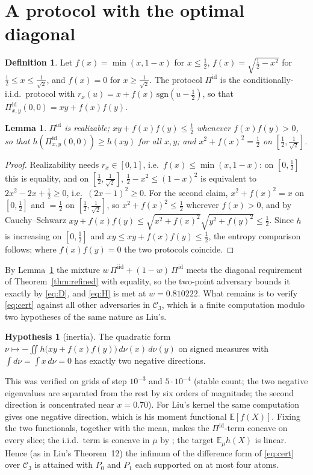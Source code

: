 \documentclass[11pt]{article}
\newtheorem{lemma}[theorem]{Lemma}
\theoremstyle{definition}
\newtheorem{definition}[theorem]{Definition}
\newtheorem{hypothesis}[theorem]{Hypothesis}
\newcommand{\E}{\mathbb{E}}
\newcommand{\cC}{\mathcal{C}}
\newcommand{\ent}{h}
\begin{document}
\section{A protocol with the optimal diagonal}
\begin{definition}\label{def:ideal}
Let $f(x)=\min(x,1-x)$ for $x\le\frac12$, $f(x)=\sqrt{\tfrac12-x^2}$ for $\frac12\le x\le\frac1{\sqrt2}$, and $f(x)=0$ for $x\ge\frac1{\sqrt2}$. The protocol $\Pi^{\mathrm{id}}$ is the conditionally-i.i.d.\ protocol with $r_x(u)=x+f(x)\,\mathrm{sgn}(u-\tfrac12)$, so that $\Pi^{\mathrm{id}}_{x,y}(0,0)=xy+f(x)f(y)$.
\end{definition}

\begin{lemma}\label{lem:ideal}
$\Pi^{\mathrm{id}}$ is realizable; $xy+f(x)f(y)\le\frac12$ whenever $f(x)f(y)>0$, so that $\ent(\Pi^{\mathrm{id}}_{x,y}(0,0))\ge\ent(xy)$ for all $x,y$; and $x^2+f(x)^2=\frac12$ on $[\frac12,\frac1{\sqrt2}]$.
\end{lemma}
\begin{proof}
Realizability needs $r_x\in[0,1]$, i.e.\ $f(x)\le\min(x,1-x)$: on $[0,\frac12]$ this is equality, and on $[\frac12,\frac1{\sqrt2}]$, $\frac12-x^2\le(1-x)^2$ is equivalent to $2x^2-2x+\frac12\ge0$, i.e.\ $(2x-1)^2\ge0$. For the second claim, $x^2+f(x)^2=x$ on $[0,\frac12]$ and $=\frac12$ on $[\frac12,\frac1{\sqrt2}]$, so $x^2+f(x)^2\le\frac12$ wherever $f(x)>0$, and by Cauchy--Schwarz $xy+f(x)f(y)\le\sqrt{x^2+f(x)^2}\sqrt{y^2+f(y)^2}\le\frac12$. Since $\ent$ is increasing on $[0,\frac12]$ and $xy\le xy+f(x)f(y)\le\frac12$, the entropy comparison follows; where $f(x)f(y)=0$ the two protocols coincide.
\end{proof}

By Lemma~\ref{lem:ideal} the mixture $w\,\Pi^{\mathrm{iid}}+(1-w)\,\Pi^{\mathrm{id}}$ meets the diagonal requirement of Theorem~\ref{thm:refined} with equality, so the two-point adversary bounds it exactly by \eqref{eq:D}, and \eqref{eq:H} is met at $w=0.810222$. What remains is to verify \eqref{eq:cert} against all other adversaries in $\cC_3$, which is a finite computation modulo two hypotheses of the same nature as Liu's.

\begin{hypothesis}[inertia]\label{hyp:inertia}
The quadratic form $\nu\mapsto-\iint\ent\big(xy+f(x)f(y)\big)\,d\nu(x)\,d\nu(y)$ on signed measures with $\int d\nu=\int x\,d\nu=0$ has exactly two negative directions.
\end{hypothesis}
This was verified on grids of step $10^{-3}$ and $5\cdot10^{-4}$ (stable count; the two negative eigenvalues are separated from the rest by six orders of magnitude; the second direction is concentrated near $x=0.70$). For Liu's kernel the same computation gives one negative direction, which is his moment functional $\E[f(X)]$. Fixing the two functionals, together with the mean, makes the $\Pi^{\mathrm{id}}$-term concave on every slice; the i.i.d.\ term is concave in $\mu$ by \cite{AHS}; the target $\E_\mu\ent(X)$ is linear. Hence (as in Liu's Theorem~12) the infimum of the difference form of \eqref{eq:cert} over $\cC_3$ is attained with $P_0$ and $P_1$ each supported on at most four atoms.
\end{document}
